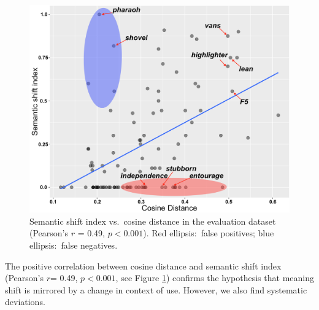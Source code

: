

\begin{figure}[t]\centering
\includegraphics[width=\columnwidth]{images/cosine_distance_shift_index_annotated_3.png}
\caption{Semantic shift index vs.~cosine distance in the evaluation dataset (Pearson's $r$ = 0.49, $p< 0.001$). 
Red ellipsis:~false positives; blue ellipsis:~false negatives.
\label{fig:shift-cosine}}
\vspace*{-5pt}
\end{figure}

The positive correlation between cosine distance and semantic shift index (Pearson's $r$= 0.49, $p<0.001$, see Figure \ref{fig:shift-cosine}) confirms the hypothesis that meaning shift is mirrored by a change in context of use. However, we also find systematic deviations. 

